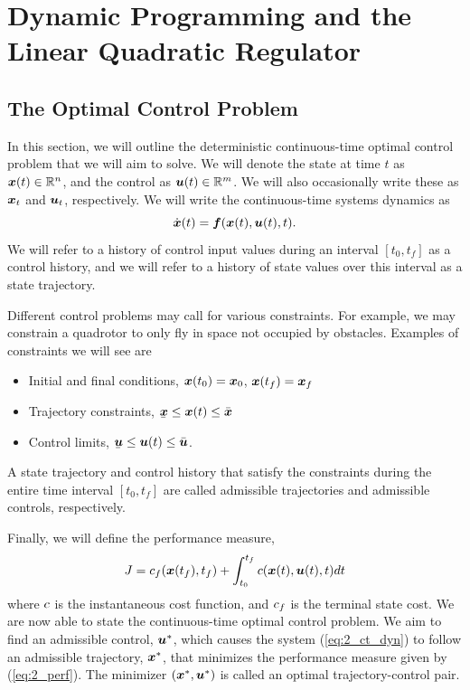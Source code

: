 \section{Dynamic Programming and the Linear Quadratic Regulator}

\subsection{The Optimal Control Problem}

In this section, we will outline the deterministic continuous-time optimal control problem that we will aim to solve. We will denote the state at time $t$ as $\bm{x}(t) \in \mathbb{R}^n$, and the control as $\bm{u}(t) \in \mathbb{R}^m$. We will also occasionally write these as $\bm{x}_t$ and $\bm{u}_t$, respectively. We will write the continuous-time systems dynamics as 
\begin{equation}
    \dot{\bm{x}}(t) = \bm{f}(\bm{x}(t),\bm{u}(t),t).
    \label{eq:2_ct_dyn}
\end{equation}
We will refer to a history of control input values during an interval $[t_0,t_f]$ as a control history, and we will refer to a history of state values over this interval as a state trajectory. 

Different control problems may call for various constraints. For example, we may constrain a quadrotor to only fly in space not occupied by obstacles. Examples of constraints we will see are
\begin{itemize}
    \item Initial and final conditions, $\bm{x}(t_0) = \bm{x}_0$, $\bm{x}(t_f) = \bm{x}_f$
    \item Trajectory constraints, $\munderbar{\st} \leq \st(t) \leq \bar{\st}$
    \item Control limits, $\munderbar{\ac} \leq \ac(t) \leq \bar{\ac}$.
\end{itemize}
A state trajectory and control history that satisfy the constraints during the entire time interval $[t_0,t_f]$ are called admissible trajectories and admissible controls, respectively. 

Finally, we will define the performance measure, 
\begin{equation}
    J = c_f(\bm{x}(t_f),t_f) + \int_{t_0}^{t_f} c(\bm{x}(t),\bm{u}(t),t) dt
    \label{eq:2_perf}
\end{equation}
where $c$ is the instantaneous cost function, and $c_f$ is the terminal state cost. We are now able to state the continuous-time optimal control problem. 
We aim to find an admissible control, $\bm{u}^*$, which causes the system (\ref{eq:2_ct_dyn}) to follow an admissible trajectory, $\bm{x}^*$, that minimizes the performance measure given by (\ref{eq:2_perf}). The minimizer $(\bm{x}^*,\bm{u}^*)$ is called an optimal trajectory-control pair. 

